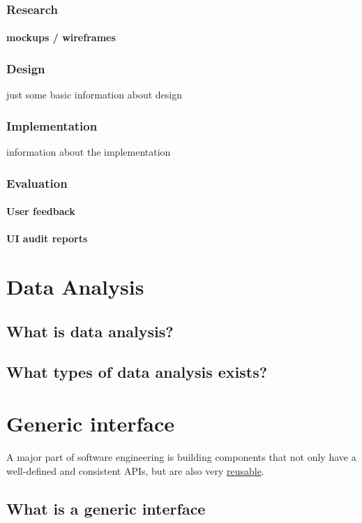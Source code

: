     \subsubsection{Research}
    \paragraph{mockups / wireframes}
    
    \subsubsection{Design}
    just some basic information about design
    
    \subsubsection{Implementation}
    information about the implementation
    
    \subsubsection{Evaluation}
    \paragraph{User feedback}
    \paragraph{UI audit reports}
    
\section{Data Analysis}
    \subsection{What is data analysis?}
    \subsection{What types of data analysis exists?}

\section{Generic interface}
    A major part of software engineering is building components that not only have a well-defined and consistent APIs, but are also very  \underline{reusable}. 
    \subsection{What is a generic interface}
    